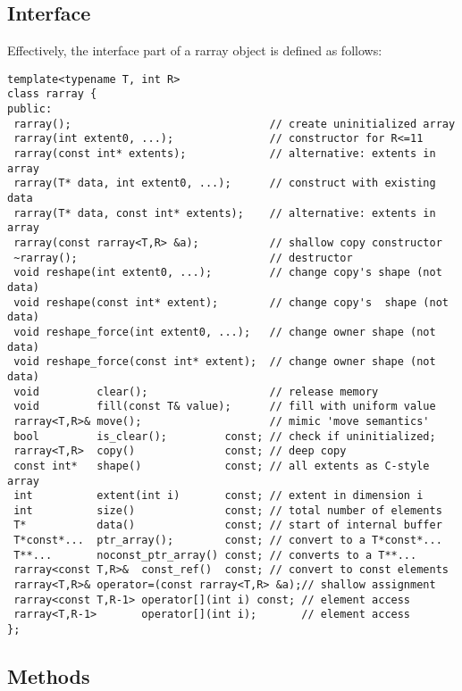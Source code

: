 \documentclass[11pt,twoside]{article}
\begin{document}
\subsection{Interface}
Effectively, the interface part of a rarray object is defined as follows:%
\vspace{-8pt}%
\begin{framed}\vspace{-14pt}%
\begin{verbatim}
template<typename T, int R>
class rarray {
public:    
 rarray();                               // create uninitialized array
 rarray(int extent0, ...);               // constructor for R<=11
 rarray(const int* extents);             // alternative: extents in array
 rarray(T* data, int extent0, ...);      // construct with existing data
 rarray(T* data, const int* extents);    // alternative: extents in array
 rarray(const rarray<T,R> &a);           // shallow copy constructor   
 ~rarray();                              // destructor 
 void reshape(int extent0, ...);         // change copy's shape (not data)
 void reshape(const int* extent);        // change copy's  shape (not data)
 void reshape_force(int extent0, ...);   // change owner shape (not data)
 void reshape_force(const int* extent);  // change owner shape (not data)
 void         clear();                   // release memory
 void         fill(const T& value);      // fill with uniform value
 rarray<T,R>& move();                    // mimic 'move semantics'
 bool         is_clear();         const; // check if uninitialized;
 rarray<T,R>  copy()              const; // deep copy
 const int*   shape()             const; // all extents as C-style array
 int          extent(int i)       const; // extent in dimension i
 int          size()              const; // total number of elements
 T*           data()              const; // start of internal buffer
 T*const*...  ptr_array();        const; // convert to a T*const*... 
 T**...       noconst_ptr_array() const; // converts to a T**... 
 rarray<const T,R>&  const_ref()  const; // convert to const elements
 rarray<T,R>& operator=(const rarray<T,R> &a);// shallow assignment
 rarray<const T,R-1> operator[](int i) const; // element access
 rarray<T,R-1>       operator[](int i);       // element access
};
\end{verbatim}
\end{framed}



\subsection{Methods}
\end{document}
